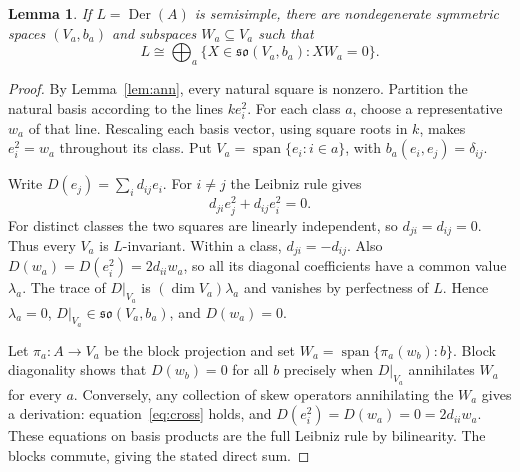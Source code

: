 \documentclass[11pt]{article}
\newtheorem{lemma}[theorem]{Lemma}
\DeclareMathOperator{\Der}{Der}
\newcommand{\so}{\mathfrak{so}}
\begin{document}
\begin{lemma}\label{lem:blocks}
If $L=\Der(A)$ is semisimple, there are nondegenerate symmetric spaces
$(V_a,b_a)$ and subspaces $W_a\subseteq V_a$ such that
\[
 L\cong\bigoplus_a\{X\in\so(V_a,b_a):XW_a=0\}.
\]
\end{lemma}
\begin{proof}
By Lemma~\ref{lem:ann}, every natural square is nonzero.
Partition the natural basis according to the lines $k e_i^2$.
For each class $a$, choose a representative $w_a$ of that line.
Rescaling each basis vector, using square roots in $k$, makes $e_i^2=w_a$
throughout its class. Put $V_a=\operatorname{span}\{e_i:i\in a\}$, with
$b_a(e_i,e_j)=\delta_{ij}$.

Write $D(e_j)=\sum_i d_{ij}e_i$. For $i\ne j$ the Leibniz rule gives
\begin{equation}\label{eq:cross}
 d_{ji}e_j^2+d_{ij}e_i^2=0.
\end{equation}
For distinct classes the two squares are linearly independent, so
$d_{ji}=d_{ij}=0$. Thus every $V_a$ is $L$-invariant.
Within a class, $d_{ji}=-d_{ij}$.
Also $D(w_a)=D(e_i^2)=2d_{ii}w_a$, so all its diagonal coefficients have
a common value $\lambda_a$. The trace of $D|_{V_a}$ is
$(\dim V_a)\lambda_a$ and vanishes by perfectness of $L$.
Hence $\lambda_a=0$, $D|_{V_a}\in\so(V_a,b_a)$, and $D(w_a)=0$.

Let $\pi_a:A\longrightarrow V_a$ be the block projection and set
$W_a=\operatorname{span}\{\pi_a(w_b):b\}$.
Block diagonality shows that $D(w_b)=0$ for all $b$ precisely when
$D|_{V_a}$ annihilates $W_a$ for every $a$.
Conversely, any collection of skew operators annihilating the $W_a$ gives a
derivation: equation~\eqref{eq:cross} holds, and
$D(e_i^2)=D(w_a)=0=2d_{ii}w_a$.
These equations on basis products are the full Leibniz rule by bilinearity.
The blocks commute, giving the stated direct sum.
\end{proof}
\end{document}
